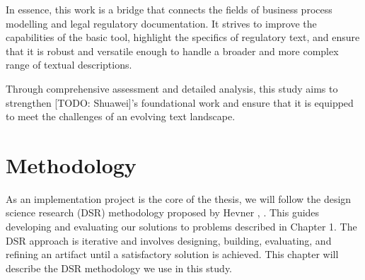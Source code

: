 In essence, this work is a bridge that connects the fields of business process modelling and legal regulatory documentation. It strives to improve the capabilities of the basic tool, highlight the specifics of regulatory text, and ensure that it is robust and versatile enough to handle a broader and more complex range of textual descriptions.

Through comprehensive assessment and detailed analysis, this study aims to strengthen [TODO: Shuawei]'s foundational work and ensure that it is equipped to meet the challenges of an evolving text landscape.





\pagebreak

\section{Methodology}
\label{sec:intro:meth}


As an implementation project is the core of the thesis, we will follow the design science research (DSR) methodology proposed by Hevner \cite{hevnerDesignScienceInformation2008}, \cite{vombrockeIntroductionDesignScience2020} \cite{peffersDesignScienceResearch}. This guides developing and evaluating our solutions to problems described in Chapter 1. The DSR approach is iterative and involves designing, building, evaluating, and refining an artifact until a satisfactory solution is achieved. This chapter will describe the DSR methodology we use in this study.


